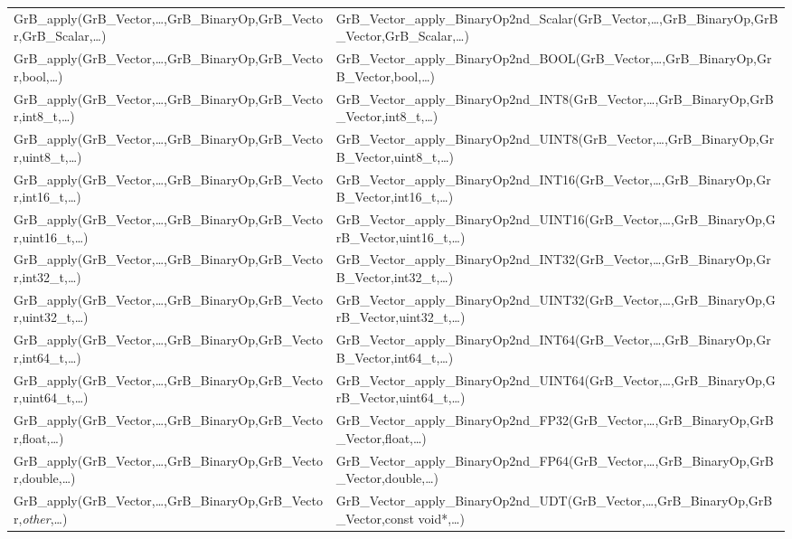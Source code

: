 \begin{landscape}
\begin{table}[htb]
{\begin{tabular}{l|l}
{\sf GrB\_apply(GrB\_Vector,\ldots,GrB\_BinaryOp,GrB\_Vector,GrB\_Scalar,\ldots)}		& {\sf GrB\_Vector\_apply\_BinaryOp2nd\_Scalar(GrB\_Vector,\ldots,GrB\_BinaryOp,GrB\_Vector,GrB\_Scalar,\ldots)} \\
{\sf GrB\_apply(GrB\_Vector,\ldots,GrB\_BinaryOp,GrB\_Vector,bool,\ldots)}		& {\sf GrB\_Vector\_apply\_BinaryOp2nd\_BOOL(GrB\_Vector,\ldots,GrB\_BinaryOp,GrB\_Vector,bool,\ldots)} \\
{\sf GrB\_apply(GrB\_Vector,\ldots,GrB\_BinaryOp,GrB\_Vector,int8\_t,\ldots)}	& {\sf GrB\_Vector\_apply\_BinaryOp2nd\_INT8(GrB\_Vector,\ldots,GrB\_BinaryOp,GrB\_Vector,int8\_t,\ldots)} \\
{\sf GrB\_apply(GrB\_Vector,\ldots,GrB\_BinaryOp,GrB\_Vector,uint8\_t,\ldots)}	& {\sf GrB\_Vector\_apply\_BinaryOp2nd\_UINT8(GrB\_Vector,\ldots,GrB\_BinaryOp,GrB\_Vector,uint8\_t,\ldots)} \\
{\sf GrB\_apply(GrB\_Vector,\ldots,GrB\_BinaryOp,GrB\_Vector,int16\_t,\ldots)}	& {\sf GrB\_Vector\_apply\_BinaryOp2nd\_INT16(GrB\_Vector,\ldots,GrB\_BinaryOp,GrB\_Vector,int16\_t,\ldots)} \\
{\sf GrB\_apply(GrB\_Vector,\ldots,GrB\_BinaryOp,GrB\_Vector,uint16\_t,\ldots)}	& {\sf GrB\_Vector\_apply\_BinaryOp2nd\_UINT16(GrB\_Vector,\ldots,GrB\_BinaryOp,GrB\_Vector,uint16\_t,\ldots)} \\
{\sf GrB\_apply(GrB\_Vector,\ldots,GrB\_BinaryOp,GrB\_Vector,int32\_t,\ldots)}	& {\sf GrB\_Vector\_apply\_BinaryOp2nd\_INT32(GrB\_Vector,\ldots,GrB\_BinaryOp,GrB\_Vector,int32\_t,\ldots)} \\
{\sf GrB\_apply(GrB\_Vector,\ldots,GrB\_BinaryOp,GrB\_Vector,uint32\_t,\ldots)}	& {\sf GrB\_Vector\_apply\_BinaryOp2nd\_UINT32(GrB\_Vector,\ldots,GrB\_BinaryOp,GrB\_Vector,uint32\_t,\ldots)} \\
{\sf GrB\_apply(GrB\_Vector,\ldots,GrB\_BinaryOp,GrB\_Vector,int64\_t,\ldots)}	& {\sf GrB\_Vector\_apply\_BinaryOp2nd\_INT64(GrB\_Vector,\ldots,GrB\_BinaryOp,GrB\_Vector,int64\_t,\ldots)} \\
{\sf GrB\_apply(GrB\_Vector,\ldots,GrB\_BinaryOp,GrB\_Vector,uint64\_t,\ldots)}	& {\sf GrB\_Vector\_apply\_BinaryOp2nd\_UINT64(GrB\_Vector,\ldots,GrB\_BinaryOp,GrB\_Vector,uint64\_t,\ldots)} \\
{\sf GrB\_apply(GrB\_Vector,\ldots,GrB\_BinaryOp,GrB\_Vector,float,\ldots)}		& {\sf GrB\_Vector\_apply\_BinaryOp2nd\_FP32(GrB\_Vector,\ldots,GrB\_BinaryOp,GrB\_Vector,float,\ldots)} \\
{\sf GrB\_apply(GrB\_Vector,\ldots,GrB\_BinaryOp,GrB\_Vector,double,\ldots)}	& {\sf GrB\_Vector\_apply\_BinaryOp2nd\_FP64(GrB\_Vector,\ldots,GrB\_BinaryOp,GrB\_Vector,double,\ldots)} \\
{\sf GrB\_apply(GrB\_Vector,\ldots,GrB\_BinaryOp,GrB\_Vector,\emph{other},\ldots)}		& {\sf GrB\_Vector\_apply\_BinaryOp2nd\_UDT(GrB\_Vector,\ldots,GrB\_BinaryOp,GrB\_Vector,const void*,\ldots)} \\
\hline
\end{tabular}
}
\label{Tab:NonPolymorphic5a}
\end{table}


\end{landscape}
